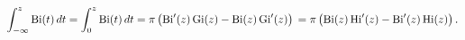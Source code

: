 \[\int_{-\infty}^{z}\mathop{\mathrm{Bi}\/}\nolimits\!\left(t\right)dt=\int_{0}^{%
z}\mathop{\mathrm{Bi}\/}\nolimits\!\left(t\right)dt=\pi\left(\mathop{\mathrm{%
Bi}\/}\nolimits'\!\left(z\right)\mathop{\mathrm{Gi}\/}\nolimits\!\left(z\right%
)-\mathop{\mathrm{Bi}\/}\nolimits\!\left(z\right)\mathop{\mathrm{Gi}\/}%
\nolimits'\!\left(z\right)\right)\\
=\pi\left(\mathop{\mathrm{Bi}\/}\nolimits\!\left(z\right)\mathop{\mathrm{Hi}\/%
}\nolimits'\!\left(z\right)-\mathop{\mathrm{Bi}\/}\nolimits'\!\left(z\right)%
\mathop{\mathrm{Hi}\/}\nolimits\!\left(z\right)\right).\]